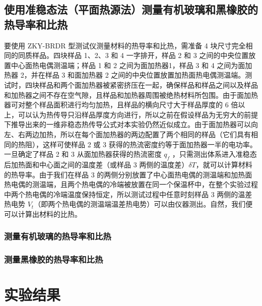 \documentclass[a4paper,utf8]{article}
\begin{document}
    \subsection{使用准稳态法（平面热源法）测量有机玻璃和黑橡胶的热导率和比热}
        要使用 ZKY-BRDR 型测试仪测量材料的热导率和比热，需准备 4 块尺寸完全相同的同质样品。四块样品 1、2、3 和 4 一字排开，样品 2 和 3 之间的中央位置放置中心面热电偶测温端；样品 1 和 2 之间为面加热器1，样品 3 和 4 之间为面加热器 2，并在样品 3 和面加热器 2 之间的中央位置放置加热面热电偶测温端。测试时，四块样品和两个面加热器被紧密挤压在一起，确保样品和样品之间以及样品和加热器之间不存在空气隙，且样品和加热器周围被绝热材料所包围。由于面加热器可对整个样品面积进行均匀加热，且样品的横向尺寸大于样品厚度的 6 倍以上，可以认为热传导只沿样品厚度方向进行，所以之前在假设样品为无穷大的前提下推导出来的一维非稳态热传导公式对本实验仍然近似成立。由于面加热器可以向左、右两边加热，所以在每个面加热器的两边配置了两个相同的样品（它们具有相同的热阻），这样可使样品 2 或 3 获得的热流密度约等于面加热器一半的电功率。一旦确定了样品 2 和 3 从面加热器获得的热流密度 $q_f$ ，只需测出体系进入准稳态后加热面和中心面之间的温度差（或样品 3 两侧的温度差）$\delta T$，就可以计算材料的热导率。由于我们在样品 3 的两侧分别放置了中心面热电偶的测温端和加热面热电偶的测温端，且两个热电偶的冷端被放置在同一个保温杯中，在整个实验过程中两个热电偶的冷端温度保持恒定，所以测试过程中任意时刻样品 3 两侧的温差热电势 $V_t$（即两个热电偶的测温端温差热电势）可以由仪器测出。自然，我们便可以计算出材料的比热。
        \subsubsection{测量有机玻璃的热导率和比热}
        \subsubsection{测量黑橡胶的热导率和比热}
\section{实验结果}
\end{document}
